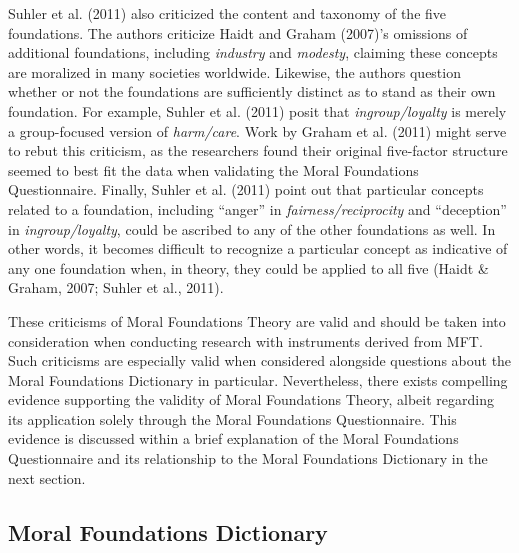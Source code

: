 \documentclass[english,,man]{apa6}
\begin{document}
Suhler et al. (2011) also criticized the content and taxonomy of the
five foundations. The authors criticize Haidt and Graham (2007)'s
omissions of additional foundations, including \emph{industry} and
\emph{modesty}, claiming these concepts are moralized in many societies
worldwide. Likewise, the authors question whether or not the foundations
are sufficiently distinct as to stand as their own foundation. For
example, Suhler et al. (2011) posit that \emph{ingroup/loyalty} is
merely a group-focused version of \emph{harm/care}. Work by Graham et
al. (2011) might serve to rebut this criticism, as the researchers found
their original five-factor structure seemed to best fit the data when
validating the Moral Foundations Questionnaire. Finally, Suhler et al.
(2011) point out that particular concepts related to a foundation,
including \enquote{anger} in \emph{fairness/reciprocity} and
\enquote{deception} in \emph{ingroup/loyalty}, could be ascribed to any
of the other foundations as well. In other words, it becomes difficult
to recognize a particular concept as indicative of any one foundation
when, in theory, they could be applied to all five (Haidt \& Graham,
2007; Suhler et al., 2011).

These criticisms of Moral Foundations Theory are valid and should be
taken into consideration when conducting research with instruments
derived from MFT. Such criticisms are especially valid when considered
alongside questions about the Moral Foundations Dictionary in
particular. Nevertheless, there exists compelling evidence supporting
the validity of Moral Foundations Theory, albeit regarding its
application solely through the Moral Foundations Questionnaire. This
evidence is discussed within a brief explanation of the Moral
Foundations Questionnaire and its relationship to the Moral Foundations
Dictionary in the next section.

\subsection{Moral Foundations
Dictionary}\label{moral-foundations-dictionary}
\end{document}
